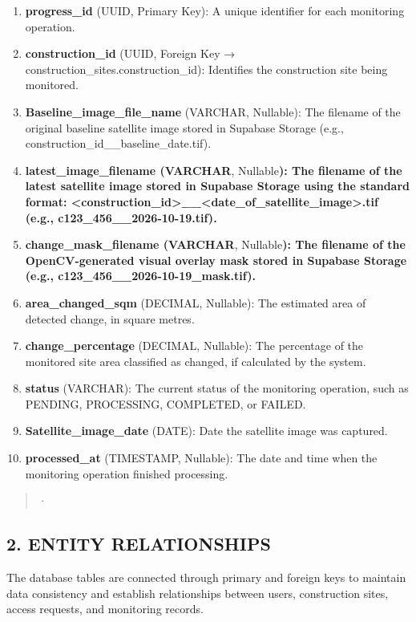 \documentclass[12pt,a4paper]{report}
\begin{document}
\begin{enumerate}
\def\labelenumi{\arabic{enumi}.}
\item
  \textbf{progress\_id} (UUID, Primary Key): A unique identifier for
  each monitoring operation.
\item
  \textbf{construction\_id} (UUID, Foreign Key →
  construction\_sites.construction\_id): Identifies the construction
  site being monitored.
\item
  \textbf{Baseline\_image\_file\_name} (VARCHAR, Nullable): The filename
  of the original baseline satellite image stored in Supabase Storage
  (e.g., construction\_id\_\_baseline\_date.tif).
\item
  \textbf{latest\_image\_filename (VARCHAR}, Nullable\textbf{): The
  filename of the latest satellite image stored in Supabase Storage
  using the standard format:
  \textless construction\_id\textgreater\_\_\textless date\_of\_satellite\_image\textgreater.tif
  (e.g., c123\_456\_\_2026-10-19.tif).}
\item
  \textbf{change\_mask\_filename (VARCHAR}, Nullable\textbf{): The
  filename of the OpenCV-generated visual overlay mask stored in
  Supabase Storage (e.g., c123\_456\_\_2026-10-19\_mask.tif).}
\item
  \textbf{area\_changed\_sqm} (DECIMAL, Nullable): The estimated area of
  detected change, in square metres.
\item
  \textbf{change\_percentage} (DECIMAL, Nullable): The percentage of the
  monitored site area classified as changed, if calculated by the
  system.
\item
  \textbf{status} (VARCHAR): The current status of the monitoring
  operation, such as PENDING, PROCESSING, COMPLETED, or FAILED.
\item
  \textbf{Satellite\_image\_date} (DATE): Date the satellite image was
  captured.
\item
  \textbf{processed\_at} (TIMESTAMP, Nullable): The date and time when
  the monitoring operation finished processing.
\end{enumerate}

\begin{quote}
·
\end{quote}

\subsection{2. ENTITY RELATIONSHIPS}\label{entity-relationships}

The database tables are connected through primary and foreign keys to
maintain data consistency and establish relationships between users,
construction sites, access requests, and monitoring records.
\end{document}
